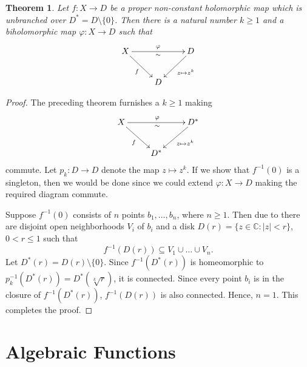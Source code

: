 \documentclass[12pt]{article}
\theoremstyle{thmstyle}
\newtheorem{theorem}{Theorem}[section]
\theoremstyle{defstyle}
\newcommand{\bbC}{\mathbb{C}}
\renewcommand{\le}{\leqslant}
\renewcommand{\ge}{\geqslant}
\begin{document}
\begin{theorem}
    Let $f: X\to D$ be a proper non-constant holomorphic map which is unbranched over $D^\ast = D\setminus\{0\}$. Then there is a natural number $k\ge 1$ and a biholomorphic map $\varphi: X\to D$ such that 
    \begin{equation*}
        \xymatrix {
            X\ar[rr]^\varphi_{\sim}\ar[rd]_-f & & D\ar[ld]^-{z\mapsto z^k}\\
            & D & 
        }
    \end{equation*}
\end{theorem}
\begin{proof}
    The preceding theorem furnishes a $k\ge 1$ making 
    \begin{equation*}
        \xymatrix {
            X\ar[rr]^\varphi_{\sim}\ar[rd]_-f & & D^\ast\ar[ld]^-{z\mapsto z^k}\\
            & D^\ast & 
        }
    \end{equation*}
    commute. Let $p_k: D\to D$ denote the map $z\mapsto z^k$. If we show that $f^{-1}(0)$ is a singleton, then we would be done since we could extend $\varphi: X\to D$ making the required diagram commute.

    Suppose $f^{-1}(0)$ consists of $n$ points $b_1,\dots, b_n$, where $n\ge 1$. Then due to  there are disjoint open neighborhoods $V_i$ of $b_i$ and a disk $D(r) = \{z\in\bbC\colon |z| < r\}$, $0 < r\le 1$ such that 
    \begin{equation*}
        f^{-1}(D(r))\subseteq V_1\cup\dots\cup V_n.
    \end{equation*}
    Let $D^\ast(r) = D(r)\setminus\{0\}$. Since $f^{-1}(D^\ast(r))$ is homeomorphic to $p_k^{-1}(D^\ast(r)) = D^\ast(\sqrt[k]{r})$, it is connected. Since every point $b_i$ is in the closure of $f^{-1}(D^\ast(r))$, $f^{-1}(D(r))$ is also connected. Hence, $n = 1$. This completes the proof.
\end{proof}

\section{Algebraic Functions}
\end{document}
